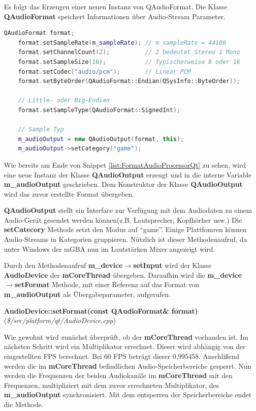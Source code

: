 \documentclass[11pt,a4paper]{scrartcl}
\newcommand{\paratitlecode}[2] {
    \vspace{5mm}
    \large \textbf{#1} \normalsize(\textit{\${#2}})
    \vspace{2mm}\newline
}
\begin{document}
Es folgt das Erzeugen einer neuen Instanz von QAudioFormat. Die Klasse \textbf{QAudioFormat} speichert Informationen \"uber Audio-Stream Parameter.

\vspace{5mm}
\begin{lstlisting}[language=C++, caption={Ausschnitt aus AudioProcessorQt::start()}, label={list:FormatAudioProcessorQt}]
    QAudioFormat format;
    format.setSampleRate(m_sampleRate); // m_sampleRate = 44100
    format.setChannelCount(2);			// 2 bedeutet Stereo 1 Mono
    format.setSampleSize(16);			// Typischerweise 8 oder 16
    format.setCodec("audio/pcm");		// Linear PCM
    format.setByteOrder(QAudioFormat::Endian(QSysInfo::ByteOrder));

    // Little- oder Big-Endian
    format.setSampleType(QAudioFormat::SignedInt);

    // Sample Typ
    m_audioOutput = new QAudioOutput(format, this);
    m_audioOutput->setCategory("game");
\end{lstlisting}
  
Wie bereits am Ende von Snippet \ref{list:FormatAudioProcessorQt} zu sehen, wird eine neue Instanz der Klasse \textbf{QAudioOutput} erzeugt und in die interne Variable \textbf{m\_audioOutput} geschrieben. 
Dem Konstruktor der Klasse \textbf{QAudioOutput} wird das zuvor erstellte Format \"ubergeben.

\textbf{QAudioOutput} stellt ein Interface zur Verf\"ugung mit dem Audiodaten zu einem Audio-Ger\"at
gesendet werden k\"onnen(z.B. Lautsprecher, Kopfh\"orher usw.) Die \textbf{setCatecory} Methode setzt den Modus auf \enquote{game}. Einige Plattfomren k\"onnen Audio-Streams in Kategorien gruppieren.
N\"utzlich ist dieser Methodenaufruf, da unter Windows der mGBA nun im Lautst\"arken Mixer angezeigt wird.

Durch den Methodenaufruf \textbf{m\_device$\rightarrow$setInput} wird der Klasse \textbf{AudioDevice} der \textbf{mCoreThread} \"ubergeben. Daraufhin wird die \textbf{m\_device$\rightarrow$setFormat} Methode, mit einer Referenz auf
das Format von \textbf{m\_audioOutput} als \"Ubergabeparameter, aufgerufen.

\newpage
\paratitlecode{AudioDevice::setFormat(const QAudioFormat\& format)}{/src/platform/qt/AudioDevice.cpp} 
Wie gewohnt wird zun\"achst \"uberpr\"uft, ob der \textbf{mCoreThread} vorhanden ist. Im n\"achsten Schritt wird ein Multiplikator errechnet. Dieser wird abh\"angig von der eingestellten FPS berechnet. Bei 60 FPS betr\"agt dieser
0,995458. Anschli{\ss}end werden die im \textbf{mCoreThread} befindlichen Audio-Speicherbereiche gesperrt. Nun werden die Frequenzen der beiden Audiokan\"ale im \textbf{mCoreThread} mit den Frequenzen, multipliziert mit dem zuvor errechneten
Multiplikator, des \textbf{m\_audioOutput} synchronisiert. Mit dem entsperren der Speicherbereiche endet die Methode.
\end{document}
